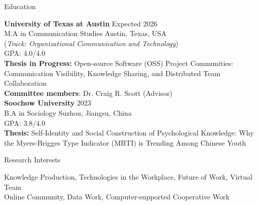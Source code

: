 \documentclass[
	11pt, %
]{resume} %
\begin{document}

\begin{rSection}{Education}
	
	\textbf{University of Texas at Austin} \hfill Expected 2026\\
	M.A in Communication Studies \hfill Austin, Texas, USA \\
	(\textit{Track: Organizational Communication and Technology}) \smallskip \\
	GPA: 4.0/4.0\\
    \textbf{Thesis in Progress:} Open-source Software (OSS) Project Communities: Communication Visibility, Knowledge Sharing, and Distributed Team Collaboration\\
    \textbf{Committee members}: Dr. Craig R. Scott (Advisor)\\

    \textbf{Soochow University} \hfill 2023 \\ 
	B.A in Sociology \hfill Suzhou, Jiangsu, China \\
	GPA: 3.8/4.0\\
    \textbf{Thesis:} Self-Identity and Social Construction of Psychological Knowledge: Why the Myers-Brigges Type Indicator (MBTI) is Trending Among Chinese Youth\\
	
\end{rSection}

\begin{rSection}{Research Interests}

Knowledge Production, Technologies in the Workplace, Future of Work, Virtual Team\\
Online Community, Data Work, Computer-supported Cooperative Work\\

\end{rSection}

\end{document}
